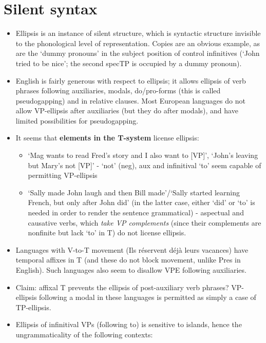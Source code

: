 \documentclass{article}
\begin{document}
\section{Silent syntax}
\begin{itemize}
    \subsection{Ellipsis}
    \item Ellipsis is an instance of silent structure, which is syntactic structure invisible to the phonological level of representation. Copies are an obvious example, as are the `dummy pronouns' in the subject position of control infinitives (`John tried to be nice'; the second specTP is occupied by a dummy pronoun).
    \item English is fairly generous with respect to ellipsis; it allows ellipsis of verb phrases following auxiliaries, modals, do/pro-forms (this is called pseudogapping) and in relative clauses. Most European languages do not allow VP-ellipsis after auxiliaries (but they do after modals), and have limited possibilities for pseudogapping.
    \item It seems that \textbf{elements in the T-system} license ellipsis:
    \begin{itemize}
        \item `Mag wants to read Fred's story and I also want to [VP]', `John's leaving but Mary's not [VP]' - `not' (neg), aux and infinitival `to' seem capable of permitting VP-ellipsis
        \item `Sally made John laugh and then Bill made'/`Sally started learning French, but only after John did' (in the latter case, either `did' or `to' is needed in order to render the sentence grammatical) - aspectual and causative verbs, which \textit{take VP complements} (since their complements are nonfinite but lack `to' in T) do not license ellipsis.
    \end{itemize}
    \item Languages with V-to-T movement (Ils réservent déjà leurs vacances) have temporal affixes in T (and these do not block movement, unlike Pres in English). Such languages also seem to disallow VPE following auxiliaries.
    \item Claim: affixal T prevents the ellipsis of post-auxiliary verb phrases? VP-ellipsis following a modal in these languages is permitted as simply a case of TP-ellipsis.
    \item Ellipsis of infinitival VPs (following to) is sensitive to islands, hence the ungrammaticality of the following contexts:

\end{itemize}
\end{document}
